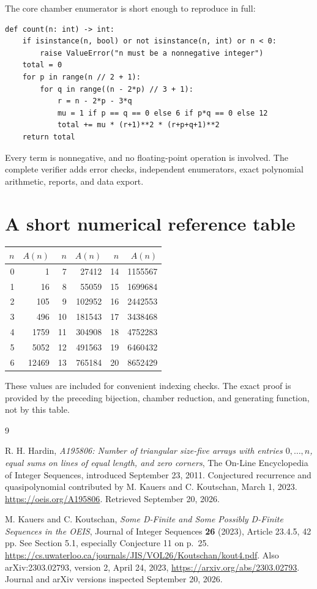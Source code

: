 \documentclass[11pt]{article}
\numberwithin{equation}{section}
\theoremstyle{definition}
\begin{document}
The core chamber enumerator is short enough to reproduce in full:
\begin{verbatim}
def count(n: int) -> int:
    if isinstance(n, bool) or not isinstance(n, int) or n < 0:
        raise ValueError("n must be a nonnegative integer")
    total = 0
    for p in range(n // 2 + 1):
        for q in range((n - 2*p) // 3 + 1):
            r = n - 2*p - 3*q
            mu = 1 if p == q == 0 else 6 if p*q == 0 else 12
            total += mu * (r+1)**2 * (r+p+q+1)**2
    return total
\end{verbatim}
Every term is nonnegative, and no floating-point operation is involved.
The complete verifier adds error checks, independent enumerators, exact
polynomial arithmetic, reports, and data export.

\section{A short numerical reference table}
\label{app:values}

\begin{center}
\begin{tabular}{rr@{\qquad}rr@{\qquad}rr}
\toprule
$n$&$A(n)$&$n$&$A(n)$&$n$&$A(n)$\\
\midrule
0&1&7&27412&14&1155567\\
1&16&8&55059&15&1699684\\
2&105&9&102952&16&2442553\\
3&496&10&181543&17&3438468\\
4&1759&11&304908&18&4752283\\
5&5052&12&491563&19&6460432\\
6&12469&13&765184&20&8652429\\
\bottomrule
\end{tabular}
\end{center}
These values are included for convenient indexing checks. The exact proof
is provided by the preceding bijection, chamber reduction, and generating
function, not by this table.

\begin{thebibliography}{9}

R. H. Hardin, \emph{A195806: Number of triangular size-five arrays with
entries $0,\ldots,n$, equal sums on lines of equal length, and zero corners},
The On-Line Encyclopedia of Integer Sequences, introduced September 23, 2011.
Conjectured recurrence and quasipolynomial contributed by M. Kauers and
C. Koutschan, March 1, 2023.
\url{https://oeis.org/A195806}.
Retrieved September 20, 2026.

M. Kauers and C. Koutschan, \emph{Some D-Finite and Some Possibly D-Finite
Sequences in the OEIS}, Journal of Integer Sequences \textbf{26} (2023),
Article 23.4.5, 42 pp. See Section 5.1, especially Conjecture 11 on p.~25.
\url{https://cs.uwaterloo.ca/journals/JIS/VOL26/Koutschan/kout4.pdf}.
Also arXiv:2303.02793, version 2, April 24, 2023,
\url{https://arxiv.org/abs/2303.02793}.
Journal and arXiv versions inspected September 20, 2026.

\end{thebibliography}
\end{document}

